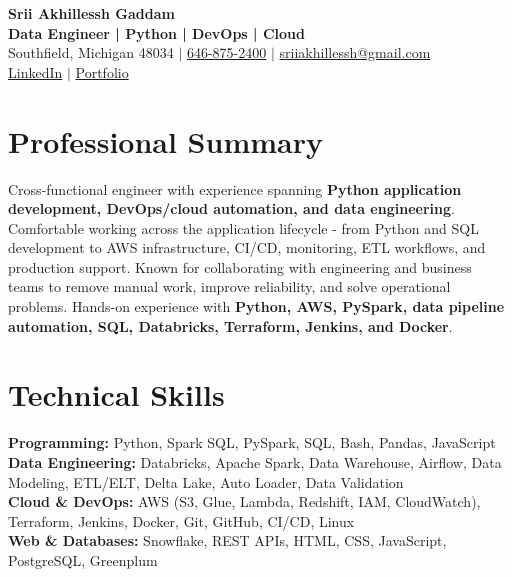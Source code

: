 \documentclass[letterpaper,10pt]{article}
\begin{document}
\fontsize{9.35pt}{10.45pt}\selectfont

\begin{center}
    {\LARGE \textbf{Srii Akhillessh Gaddam}} \\[-1pt]
    \textbf{Data Engineer | Python | DevOps | Cloud} \\[2pt]
    Southfield, Michigan 48034 $|$
    \href{tel:6468752400}{646-875-2400} $|$
    \href{mailto:sriiakhillessh@gmail.com}{sriiakhillessh@gmail.com} \\[1pt]
    \href{https://www.linkedin.com/in/srii-akhiilessh-gaddam-b48668191/}{LinkedIn} $|$
    \href{https://sriiakhillesshg.github.io/portfolio/}{Portfolio}
\end{center}
\vspace{-8pt}

\section{Professional Summary}
\small{Cross-functional engineer with experience spanning \textbf{Python application development, DevOps/cloud automation, and data engineering}. Comfortable working across the application lifecycle - from Python and SQL development to AWS infrastructure, CI/CD, monitoring, ETL workflows, and production support. Known for collaborating with engineering and business teams to remove manual work, improve reliability, and solve operational problems. Hands-on experience with \textbf{Python, AWS, PySpark, data pipeline automation, SQL, Databricks, Terraform, Jenkins, and Docker}.}

\section{Technical Skills}
\small{
\textbf{Programming:} Python, Spark SQL, PySpark, SQL, Bash, Pandas, JavaScript \\
\textbf{Data Engineering:} Databricks, Apache Spark, Data Warehouse, Airflow, Data Modeling, ETL/ELT, Delta Lake, Auto Loader, Data Validation \\
\textbf{Cloud \& DevOps:} AWS (S3, Glue, Lambda, Redshift, IAM, CloudWatch), Terraform, Jenkins, Docker, Git, GitHub, CI/CD, Linux \\
\textbf{Web \& Databases:} Snowflake, REST APIs, HTML, CSS, JavaScript, PostgreSQL, Greenplum
}
\end{document}
